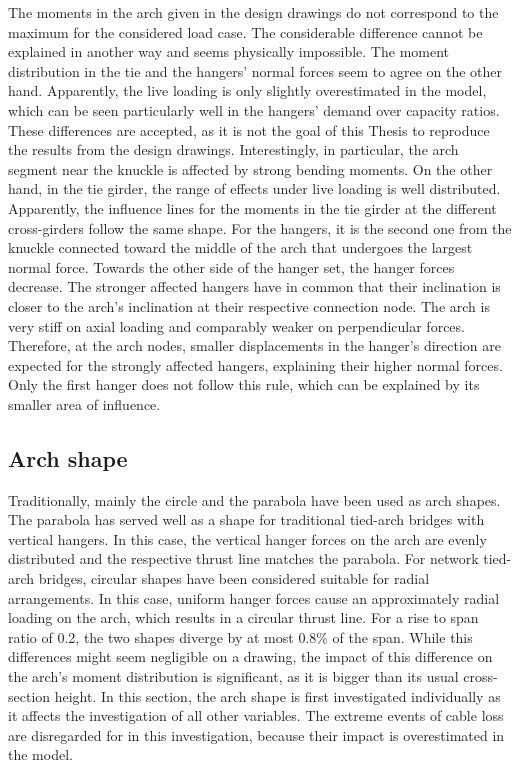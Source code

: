 The moments in the arch given in the design drawings do not correspond to the maximum for the considered load case. The considerable difference cannot be explained in another way and seems physically impossible. The moment distribution in the tie and the hangers' normal forces seem to agree on the other hand. Apparently, the live loading is only slightly overestimated in the model, which can be seen particularly well in the hangers' demand over capacity ratios. These differences are accepted, as it is not the goal of this Thesis to reproduce the results from the design drawings. Interestingly, in particular, the arch segment near the knuckle is affected by strong bending moments. On the other hand, in the tie girder, the range of effects under live loading is well distributed. Apparently, the influence lines for the moments in the tie girder at the different cross-girders follow the same shape. For the hangers, it is the second one from the knuckle connected toward the middle of the arch that undergoes the largest normal force. Towards the other side of the hanger set, the hanger forces decrease. The stronger affected hangers have in common that their inclination is closer to the arch's inclination at their respective connection node. The arch is very stiff on axial loading and comparably weaker on perpendicular forces. Therefore, at the arch nodes, smaller displacements in the hanger's direction are expected for the strongly affected hangers, explaining their higher normal forces. Only the first hanger does not follow this rule, which can be explained by its smaller area of influence. \medskip

\newpage
\subsection{Arch shape}
Traditionally, mainly the circle and the parabola have been used as arch shapes. The parabola has served well as a shape for traditional tied-arch bridges with vertical hangers. In this case, the vertical hanger forces on the arch are evenly distributed and the respective thrust line matches the parabola. For network tied-arch bridges, circular shapes have been considered suitable for radial arrangements. In this case, uniform hanger forces cause an approximately radial loading on the arch, which results in a circular thrust line. For a rise to span ratio of 0.2, the two shapes diverge by at most 0.8\% of the span. While this differences might seem negligible on a drawing, the impact of this difference on the arch's moment distribution is significant, as it is bigger than its usual cross-section height. In this section, the arch shape is first investigated individually as it affects the investigation of all other variables. The extreme events of cable loss are disregarded for in this investigation, because their impact is overestimated in the model. \medskip


